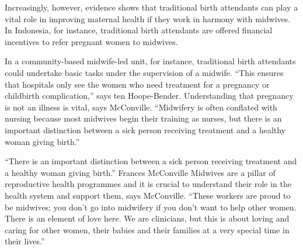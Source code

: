 \documentclass{article}
\begin{document}
Increasingly, however, evidence shows that traditional birth attendants can play
a vital role in
improving maternal health if they work in harmony with midwives. In Indonesia,
for instance,
traditional birth attendants are offered financial incentives to refer pregnant
women to
midwives.

In a community-based midwife-led unit, for instance, traditional birth
attendants could undertake
basic tasks under the supervision of a midwife. “This ensures that hospitals
only see the
women who need treatment for a pregnancy or childbirth complication,” says ten
Hoope-Bender.
Understanding that pregnancy is not an illness is vital, says McConville.
“Midwifery is often
conflated with nursing because most midwives begin their training as nurses, but
there is an
important distinction between a sick person receiving treatment and a healthy
woman giving
birth.”

“There is an important distinction between a sick person receiving treatment and
a healthy
woman giving birth.”
Frances McConville
Midwives are a pillar of reproductive health programmes and it is crucial to
understand their
role in the health system and support them, says McConville. “These workers are
proud to be
midwives; you don't go into midwifery if you don't want to help other women.
There is
an element of love here. We are clinicians, but this is about loving and caring
for other women,
their babies and their families at a very special time in their lives.”
\end{document}
